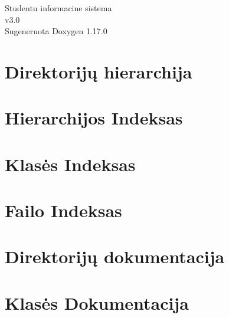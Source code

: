 \documentclass[twoside]{book}
\newcommand{\+}{\discretionary{\mbox{\scriptsize$\hookleftarrow$}}{}{}}
\newcommand{\clearemptydoublepage}{%
    \newpage{\pagestyle{empty}\cleardoublepage}%
  }
\begin{document}
  \raggedbottom
    \hypersetup{pageanchor=false,
                bookmarksnumbered=true,
                pdfencoding=unicode
               }
  \begin{titlepage}
  \vspace*{7cm}
  \begin{center}%
  {\Large Studentu informacine sistema}\\
  [1ex]\large v3.\+0 \\
  \vspace*{1cm}
  {\large Sugeneruota Doxygen 1.17.0}\\
  \end{center}
  \end{titlepage}
  \clearemptydoublepage
  \tableofcontents
  \clearemptydoublepage
  \hypersetup{pageanchor=true}

\chapter{Direktorijų hierarchija}

\chapter{Hierarchijos Indeksas}

\chapter{Klasės Indeksas}

\chapter{Failo Indeksas}

\chapter{Direktorijų dokumentacija}


\chapter{Klasės Dokumentacija}




\end{document}
